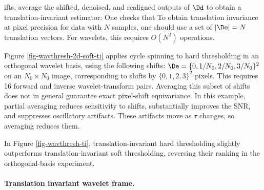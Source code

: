 ifts, average the shifted, denoised, and realigned outputs of $\Dd$ to obtain a translation-invariant estimator:
One checks that
To obtain translation invariance at pixel precision for data with $N$ samples, one should use a set of $|\De|=N$ translation vectors. For wavelets, this requires $O(N^2)$ operations.

Figure \ref{fig-wavthresh-2d-soft-ti} applies cycle spinning to hard thresholding in an orthogonal wavelet basis, using the following shifts:
$\De = \{ 0, 1/N_0, 2/N_0, 3/N_0 \}^2$ on an $N_0\times N_0$ image, corresponding to shifts by $\{ 0, 1, 2, 3 \}^2$ pixels.
This requires 16 forward and inverse wavelet-transform pairs. Averaging this subset of shifts does not in general guarantee exact pixel-shift equivariance. In this example, partial averaging reduces sensitivity to shifts, substantially improves the SNR, and suppresses oscillatory artifacts. These artifacts move as $\tau$ changes, so averaging reduces them.

In Figure \ref{fig-wavthresh-ti}, translation-invariant hard thresholding slightly outperforms translation-invariant soft thresholding, reversing their ranking in the orthogonal-basis experiment.                                                                                               





                                      
                                                                                                                                                                                                                         

  
\paragraph{Translation invariant wavelet frame.}

